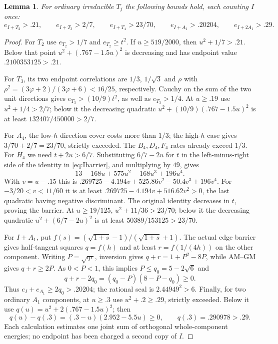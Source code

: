 \documentclass[11pt]{article}
\newtheorem{lemma}[theorem]{Lemma}
\begin{document}
\begin{lemma}\label{lem:Ijoint}
For ordinary irreducible $T_j$ the following bounds hold, each counting
$I$ once:
\[
 e_{I+T_2}>.21,\qquad e_{I+T_3}>2/7,\qquad
 e_{I+T_4}>23/70,\qquad e_{I+A_1}>.20204,
 \qquad e_{I+2A_1}>.29.
\]
\end{lemma}
\begin{proof}
For $T_2$ use $e_{T_2}>1/7$ and $e_{T_2}\ge t^2$.
If $u\ge519/2000$, then $u^2+1/7>.21$.
Below that point $u^2+(.767-1.5u)^2$ is decreasing and has
endpoint value $.2100353125>.21$.

For $T_3$, its two endpoint correlations are $1/3$, $1/\sqrt3$
and $\rho$ with $\rho^2=(3\varphi+2)/(3\varphi+6)<16/25$,
respectively. Cauchy on the sum of the two unit directions gives
$e_{T_3}>(10/9)t^2$, as well as $e_{T_3}>1/4$.
At $u\ge.19$ use $u^2+1/4>2/7$; below it the decreasing
quadratic $u^2+(10/9)(.767-1.5u)^2$ is at least
$132407/450000>2/7$.

For $A_4$, the low-$h$ direction cover costs more than $1/3$;
the high-$h$ case gives $3/70+2/7=23/70$, strictly exceeded.
The $B_4,D_4,F_4$ rates already exceed $1/3$.
For $H_4$ we need $t+2u>6/7$. Substituting $6/7-2u$ for $t$
in the left-minus-right side of the identity in
\eqref{eq:Ibarrier}, and multiplying by $49$, gives
\[
13-168u+575u^2-168u^3+196u^4.
\]
With $v=u-.15$ this is
$.269725-4.194v+525.86v^2-50.4v^3+196v^4$.
For $-3/20<v<11/60$ it is at least
$.269725-4.194v+516.62v^2>0$, the last quadratic having
negative discriminant. The original identity decreases in $t$,
proving the barrier. At $u\ge19/125$, $u^2+11/36>23/70$;
below it the decreasing quadratic $u^2+(6/7-2u)^2$ is at least
$50389/153125>23/70$.

For $I+A_1$, put $f(s)=(\sqrt{1+s}-1)/(\sqrt{1+s}+1)$.
The actual edge barrier gives half-tangent squares
$q=f(h)$ and at least $r=f(1/(4h))$ on the other component.
Writing $P=\sqrt{qr}$, inversion gives
$q+r=1+P^2-8P$, while AM--GM gives $q+r\ge2P$.
As $0<P<1$, this implies $P\le q_0=5-2\sqrt6$ and
\[
 q+r-2q_0=(q_0-P)(8-P-q_0)\ge0.
\]
Thus $e_I+e_{A_1}\ge2q_0>.20204$; the rational seal is
$2.44949^2>6$.
Finally, for two ordinary $A_1$ components, at $u\ge.3$ use
$u^2+.2\ge.29$, strictly exceeded. Below it use
$q(u)=u^2+2(.767-1.5u)^2$; then
\[
q(u)-q(.3)=(.3-u)(2.952-5.5u)\ge0,
\qquad q(.3)=.290978>.29.
\]
Each calculation estimates one joint sum of orthogonal whole-component
energies; no endpoint has been charged a second copy of $I$.
\end{proof}
\end{document}
